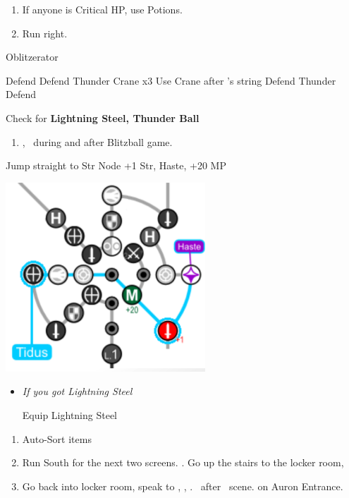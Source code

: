 \begin{enumerate}[resume]
  \item If anyone is Critical HP, use Potions.
  \item Run right.
\end{enumerate}
\begin{battle}[3000]{Oblitzerator}
  \begin{itemize}
    \kimahrif Defend
    \tidusf Defend
    \luluf Thunder Crane x3
    \tidusf Use Crane after \lulu's string
    \kimahrif Defend
    \luluf Thunder
    \tidusf Defend
  \end{itemize}
  Check for \textbf{Lightning Steel, Thunder Ball}
\end{battle}
\begin{enumerate}[resume]
  \item \cs[2:00], \sd\ during and after Blitzball game.
\end{enumerate}
\vfill
\begin{spheregrid}
  \begin{itemize}
    \tidusf Jump straight to Str Node
    \tidusf +1 Str, Haste, +20 MP
  \end{itemize}
  \includegraphics{graphics/haste}
\end{spheregrid}
\begin{equip}
  \begin{itemize}
    \item \textit{If you got Lightning Steel}
          \begin{itemize}
            \tidusf Equip Lightning Steel
          \end{itemize}
  \end{itemize}
\end{equip}
\begin{enumerate}[resume]
  \item Auto-Sort items
  \item Run South for the next two screens. \save. Go up the stairs to the locker room, \sd
  \item Go back into locker room, speak to \wakka, \sd, \cs[1:20]. \sd\ after \lulu\ scene. \cs[1:40] on Auron Entrance.
\end{enumerate}

